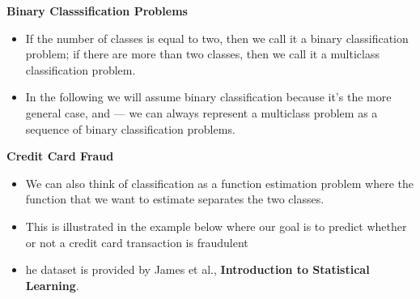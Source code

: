 \documentclass[MASTER.tex]{subfiles}
\begin{document}
\begin{frame}[fragile]

 	\Large
 	\textbf{Binary Classsification Problems}\\
 	\begin{itemize}
\item If the number of classes is equal to two, then we call it a binary classification problem; if there are more than two classes, then we call it a multiclass classification problem.
\item  In the following we will assume binary classification because it’s the more general case, and — we can always represent a multiclass problem as a sequence of binary classification problems.
\end{itemize}

\end{frame}
\begin{frame}[fragile]
	\Large
\textbf{Credit Card Fraud}
\begin{itemize}
\item We can also think of classification as a function estimation problem where the function that we want to estimate separates the two classes. 
\item This is illustrated in the example below where our goal is to predict whether or not a credit card transaction is fraudulent
\item he dataset is provided by James et al., \textbf{Introduction to Statistical Learning}.
\end{itemize}

\end{frame}
\end{document}
